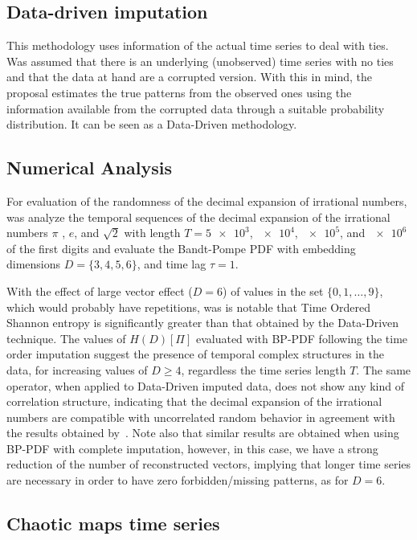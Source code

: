 \documentclass[11pt]{article}
\begin{document}
\subsection*{Data-driven imputation}

This methodology uses information of the actual time series to deal with ties. 
Was assumed that there is an underlying (unobserved) time series with no ties and that the data at hand are a corrupted version. 
With this in mind, the proposal estimates the true patterns from the observed ones using the information available from the corrupted data through a suitable probability distribution. 
It can be seen as a Data-Driven methodology.

\subsection*{Numerical Analysis}

For evaluation of the randomness of the decimal expansion of irrational numbers, was analyze the temporal sequences of the decimal expansion of the irrational numbers $\pi$ , $e$, and $\sqrt{2}$ with length $T = \num[scientific-notation=true]{5 e3}$, $\num[scientific-notation=true]{e4}$, $\num[scientific-notation=true]{e5}$, and $\num[scientific-notation=true]{e6}$ of the first digits and evaluate the Bandt-Pompe PDF with embedding dimensions $D = \{3, 4, 5, 6\}$, and time lag $\tau = 1$.

With the effect of large vector effect ($D = 6$) of values in the set $\{0, 1, \dots, 9\}$, which would probably have repetitions, was is notable that Time Ordered Shannon entropy is significantly greater than that obtained by the Data-Driven technique.
The values of $H(D)[\Pi]$ evaluated with BP-PDF following the time order imputation suggest the presence of temporal complex structures in the data, for increasing values of $D \ge 4$, regardless the time series length $T$.
The same operator, when applied to Data-Driven imputed data, does not show any kind of correlation structure, indicating that the decimal expansion of the irrational numbers are compatible with uncorrelated random behavior in agreement with the results obtained by~.
Note also that similar results are obtained when using BP-PDF with complete imputation, however, in this case, we have a strong reduction of the number of reconstructed vectors, implying that longer time series are necessary in order to have zero forbidden/missing patterns, as for $D = 6$.

\subsection*{Chaotic maps time series}
\end{document}
